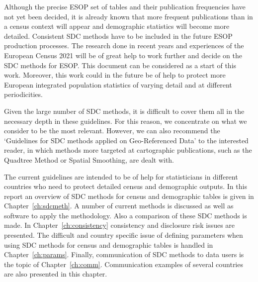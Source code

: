Although the precise ESOP set of tables and their publication frequencies have not yet been decided, it is already known that more frequent publications than in a census context will appear and demographic statistics will become more detailed. Consistent SDC methods have to be included in the future ESOP production processes. The research done in recent years and experiences of the European Census 2021 will be of great help to work further and decide on the SDC methods for ESOP. This document can be considered as a start of this work. Moreover, this work could in the future be of help to protect more European integrated population statistics of varying detail and at different periodicities.


Given the large number of SDC methods, it is difficult to cover them all in the necessary depth in these guidelines. For this reason, we concentrate on what we consider to be the most relevant. However, we can also recommend the `Guidelines for SDC methods applied on Geo-Referenced Data' \cite{Guidelines1_GeoGL} to the interested reader, in which  methods more targeted at cartographic publications, such as the Quadtree Method or Spatial Smoothing, are dealt with.

The current guidelines are intended to be of help for statisticians in different countries who need to protect detailed census and demographic outputs. In this report an overview of SDC methods for census and demographic tables is given in Chapter~\ref{ch:sdcmeth}. A number of current methods is discussed as well as software to apply the methodology. Also a comparison of these SDC methods is made. In Chapter~\ref{ch:consistency} consistency and disclosure risk issues are presented. The difficult and country specific issue of defining parameters when using SDC methods for census and demographic tables is handled in Chapter~\ref{ch:params}. Finally, communication of SDC methods to data users is the topic of Chapter~\ref{ch:comm}. Communication examples of several countries are also presented in this chapter.
